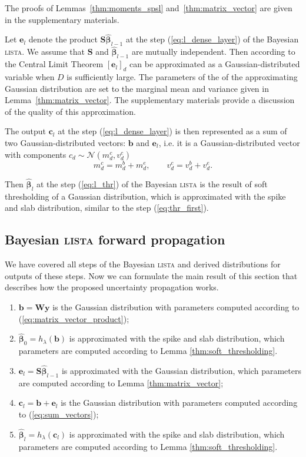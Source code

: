 \documentclass{article}
\begin{document}
The proofs of Lemmas~\ref{thm:moments_spsl} and~\ref{thm:matrix_vector} are given in the supplementary materials.

Let $\mathbf{e}_l$ denote the product $\mathbf{S}\widehat{\boldsymbol\beta}_{l-1}$ at the step (\ref{eq:l_dense_layer}) of the Bayesian \textsc{lista}. We assume that $\mathbf{S}$ and $\widehat{\boldsymbol\beta}_{l-1}$ are mutually independent. Then according to the Central Limit Theorem $[ \mathbf{e}_l ]_d$ can be approximated as a Gaussian-distributed variable when $D$ is sufficiently large. The parameters of the of the approximating Gaussian distribution are set to the marginal mean and variance given in Lemma~\ref{thm:matrix_vector}. The supplementary materials provide a discussion of the quality of this approximation.

The output $\mathbf{c}_l$ at the step (\ref{eq:l_dense_layer}) is then represented as a sum of two Gaussian-distributed vectors: $\mathbf{b}$ and $\mathbf{e}_l$, i.e. it is a Gaussian-distributed vector with components $c_{d} \sim \mathcal{N}(m^c_{d}, v^c_{d})$
\begin{equation}
\label{eq:sum_vectors}
m^c_{d} = m^b_{d} + m^e_{d}, \qquad
v^c_{d} = v^b_{d} + v^e_{d}.
\end{equation}


Then $\widehat{\boldsymbol\beta}_{l}$ at the step (\ref{eq:l_thr}) of the Bayesian \textsc{lista} is the result of soft thresholding of a Gaussian distribution, which is approximated with the spike and slab distribution,  similar to the step (\ref{eq:thr_first}).

\subsection{Bayesian \textsc{lista} forward propagation}
We have covered all steps of the Bayesian \textsc{lista} and derived distributions for outputs of these steps. Now we can formulate the main result of this section that describes how the proposed uncertainty propagation works.

\begin{enumerate}
	\item $\mathbf{b} = \mathbf{W}\mathbf{y}$ is the Gaussian distribution with parameters computed according to (\ref{eq:matrix_vector_product});
	\item $\widehat{\boldsymbol\beta}_{0} = h_\lambda(\mathbf{b})$ is approximated with the spike and slab distribution, which parameters are computed according to Lemma \ref{thm:soft_thresholding}.
	\item $\mathbf{e}_l = \mathbf{S}\widehat{\boldsymbol\beta}_{l-1}$ is approximated with the Gaussian distribution, which parameters are computed according to Lemma \ref{thm:matrix_vector};
	\item $\mathbf{c}_l = \mathbf{b} + \mathbf{e}_l$ is the Gaussian distribution with parameters computed according to (\ref{eq:sum_vectors});
	\item $\widehat{\boldsymbol\beta}_{l} = h_\lambda(\mathbf{c}_l)$ is approximated with the spike and slab distribution, which parameters are computed according to Lemma \ref{thm:soft_thresholding}.
\end{enumerate}
\end{document}
